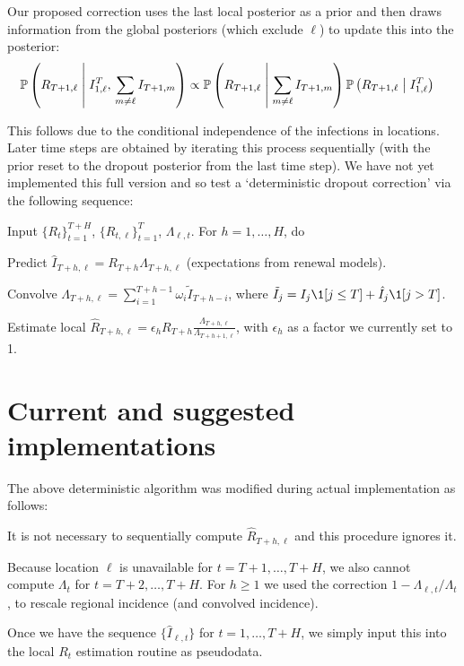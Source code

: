 \documentclass[12pt]{article}
\newcommand{\cond}{\; \m| \;}
\begin{document}
Our proposed correction uses the last local posterior as a prior and then draws
information from the global posteriors (which exclude $\ell$) to update this
into the posterior:
\begin{align}
& \mathbb{P}\left(R_{T+1, \ell} \cond I_{1, \ell}^T, \, \sum_{m \neq \ell} I_{T+1, m} \right) \propto \mathbb{P}\left(R_{T+1, \ell}  \cond \sum_{m \neq \ell} I_{T+1, m}\right)\mathbb{P}\left(R_{T+1, \ell}  \cond I_{1, \ell}^{T}\right)\label{eq: 2}
\end{align}


This follows due to the conditional independence of the infections in locations.
Later time steps are obtained by iterating this process sequentially (with the
prior reset to the dropout posterior from the last time step). We have not yet
implemented this full version and so test a `deterministic dropout correction'
via the following sequence:

Input $\{R_t\}_{t=1}^{T+H}$, $\{R_{t, \ell}\}_{t=1}^{T}$, $\Lambda_{\ell,t}$.
For $h = 1,\ldots,H$, do

\benum
\item Predict $\hat{I}_{T + h, \ell} = R_{T+h}\Lambda_{T+h, \ell}$ (expectations from renewal models).
\item Convolve $\Lambda_{T+h, \ell} = \sum_{i=1}^{T+h-1} \omega_{i}\tilde{I}_{T + h
- i}$, where $\tilde{I}_j = I_j \1[j\leq T] + \hat{I}_j \1[j>T]$.
\item Estimate local $\hat{R}_{T+h, \ell} = \epsilon_{h} R_{T+h} \frac{\Lambda_{T+h, \ell}}
{\Lambda_{T+h+1, \ell}}$, with $\epsilon_h$ as a factor we currently set to 1.
\eenum

\section*{Current and suggested implementations}\label{sec:implement}

The above deterministic algorithm was modified during actual implementation as
follows:

\bitem
\item It is not necessary to sequentially compute $\hat{R}_{T+h, \ell}$ and this
procedure ignores it. 
\item Because location $\ell$ is unavailable for $t=T+1,\ldots,T+H$, we also
cannot compute $\Lambda_t$ for $t=T+2,\ldots,T+H$. For $h \geq 1$ we used the
correction $1 - \Lambda_{\ell, t}/\Lambda_{t}$, to rescale regional incidence
(and convolved incidence).
\item Once we have the sequence $\{\hat{I}_{\ell, t}\}$ for $t=1,\ldots,T+H$, we
simply input this into the local $R_t$ estimation routine as pseudodata.
\eitem
\end{document}
